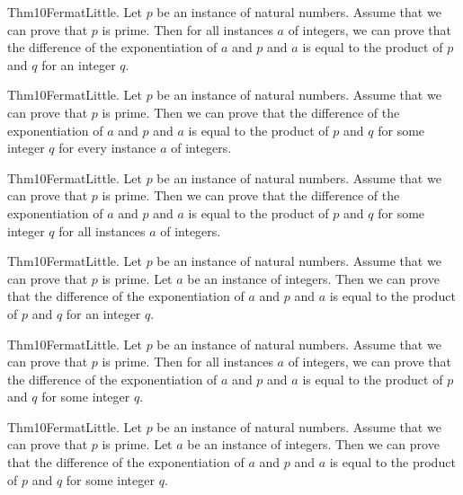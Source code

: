 \documentclass{article}
\begin{document}
Thm10FermatLittle. Let $p$ be an instance of natural numbers. Assume that we can prove that $p$ is prime. Then for all instances $a$ of integers, we can prove that the difference of the exponentiation of $a$ and $p$ and $a$ is equal to the product of $p$ and $q$ for an integer $q$.

Thm10FermatLittle. Let $p$ be an instance of natural numbers. Assume that we can prove that $p$ is prime. Then we can prove that the difference of the exponentiation of $a$ and $p$ and $a$ is equal to the product of $p$ and $q$ for some integer $q$ for every instance $a$ of integers.

Thm10FermatLittle. Let $p$ be an instance of natural numbers. Assume that we can prove that $p$ is prime. Then we can prove that the difference of the exponentiation of $a$ and $p$ and $a$ is equal to the product of $p$ and $q$ for some integer $q$ for all instances $a$ of integers.

Thm10FermatLittle. Let $p$ be an instance of natural numbers. Assume that we can prove that $p$ is prime. Let $a$ be an instance of integers. Then we can prove that the difference of the exponentiation of $a$ and $p$ and $a$ is equal to the product of $p$ and $q$ for an integer $q$.

Thm10FermatLittle. Let $p$ be an instance of natural numbers. Assume that we can prove that $p$ is prime. Then for all instances $a$ of integers, we can prove that the difference of the exponentiation of $a$ and $p$ and $a$ is equal to the product of $p$ and $q$ for some integer $q$.

Thm10FermatLittle. Let $p$ be an instance of natural numbers. Assume that we can prove that $p$ is prime. Let $a$ be an instance of integers. Then we can prove that the difference of the exponentiation of $a$ and $p$ and $a$ is equal to the product of $p$ and $q$ for some integer $q$.
\end{document}
